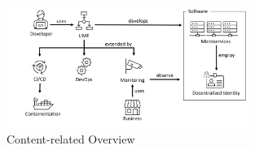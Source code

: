 \begin{figure}[tb]
	\centering
	\includegraphics[width=0.7\textwidth]{figures/content_overview.png}
	\caption{Content-related Overview}
	\label{fig:content_overview}
\end{figure}